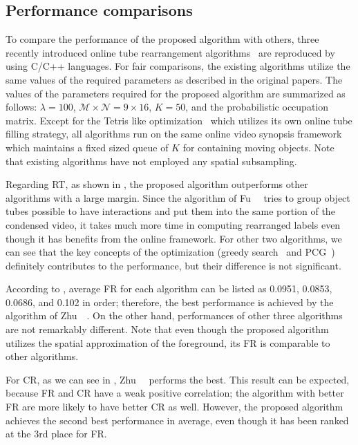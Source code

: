 \documentclass[11pt]{hyu_thesis}
\begin{document}
\subsection{Performance comparisons}
\label{sec:exp:comparison}
To compare the performance of the proposed algorithm with others, three recently introduced online tube rearrangement algorithms~\cite{Fu2014,JianqingZhu2015,He2017} are reproduced by using C/C++ languages. For fair comparisons, the existing algorithms utilize the same values of the required parameters as described in the original papers. The values of the parameters required for the proposed algorithm are summarized as follows: $\lambda=100$, $\mathcal{M}\times\mathcal{N}=9\times16$, $K=50$, and the probabilistic occupation matrix. Except for the Tetris like optimization~\cite{JianqingZhu2015} which utilizes its own online tube filling strategy, all algorithms run on the same online video synopsis framework which maintains a fixed sized queue of $K$ for containing moving objects. Note that existing algorithms have not employed any spatial subsampling.

Regarding RT, as shown in , the proposed algorithm outperforms other algorithms with a large margin. Since the algorithm of Fu~\etal~\cite{Fu2014} tries to group object tubes possible to have interactions and put them into the same portion of the condensed video, it takes much more time in computing rearranged labels even though it has benefits from the online framework. For other two algorithms, we can see that the key concepts of the optimization (greedy search~\cite{JianqingZhu2015} and PCG~\cite{He2017}) definitely contributes to the performance, but their difference is not significant. 

According to , average FR for each algorithm can be listed as 0.0951, 0.0853, 0.0686, and 0.102 in order; therefore, the best performance is achieved by the algorithm of Zhu~\etal~\cite{JianqingZhu2015}. On the other hand, performances of other three algorithms are not remarkably different. Note that even though the proposed algorithm utilizes the spatial approximation of the foreground, its FR is comparable to other algorithms.

For CR, as we can see in , Zhu~\etal~\cite{JianqingZhu2015} performs the best. This result can be expected, because FR and CR have a weak positive correlation; the algorithm with better FR are more likely to have better CR as well. However, the proposed algorithm achieves the second best performance in average, even though it has been ranked at the 3rd place for FR.
\end{document}
